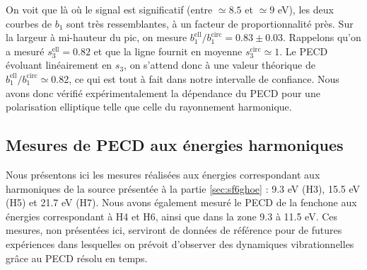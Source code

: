 On voit que là où le signal est significatif (entre $\simeq8.5$ et $\simeq 9$ eV), les deux courbes de $b_1$ sont très ressemblantes, à un facteur de proportionnalité près. Sur la largeur à mi-hauteur du pic, on mesure $b_1^{\text{ell}}/b_1^{\text{circ}} = 0.83 \pm 0.03$. Rappelons qu'on a mesuré $s_3^{\text{ell}} = 0.82$ et que la ligne fournit en moyenne $s_3^{\text{circ}} \simeq 1$. Le PECD évoluant linéairement en $s_3$, on s'attend donc à une valeur théorique de $b_1^{\text{ell}}/b_1^{\text{circ}} \simeq 0.82$, ce qui est tout à fait dans notre intervalle de confiance. Nous avons donc vérifié expérimentalement la dépendance du PECD pour une polarisation elliptique telle que celle du rayonnement harmonique.

\subsection{Mesures de PECD aux énergies harmoniques}
Nous présentons ici les mesures réalisées aux énergies correspondant aux harmoniques de la source présentée à la partie \ref{sec:sf6ghoe} : 9.3 eV (H3), 15.5 eV (H5) et 21.7 eV (H7). Nous avons également mesuré le PECD de la fenchone aux énergies correspondant à H4 et H6, ainsi que dans la zone 9.3 à 11.5 eV. Ces mesures, non présentées ici, serviront de données de référence pour de futures expériences dans lesquelles on prévoit d'observer des dynamiques vibrationnelles grâce au PECD résolu en temps.


